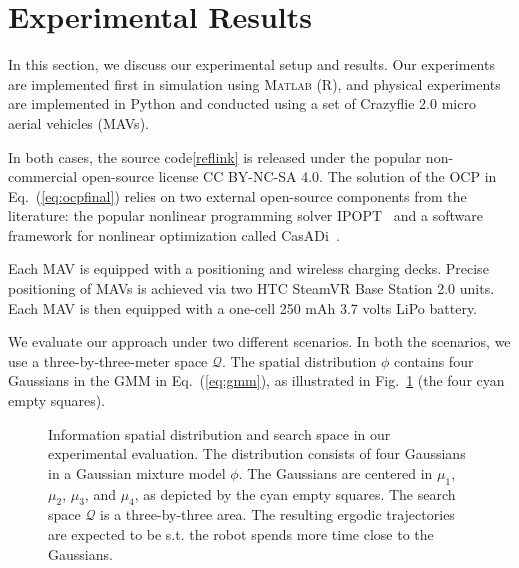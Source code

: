 \documentclass[letterpaper,10pt,conference,twoside]{IEEEtran}
\theoremstyle{definition}
\begin{document}
\section{Experimental Results}\label{sec:res}
\noindent
In this section, we discuss our experimental setup and results. Our experiments are implemented first in simulation using  \textsc{Matlab} (R), and physical experiments  are implemented in Python and conducted using a set of Crazyflie 2.0 micro aerial vehicles (MAVs). 

In both cases, the source code\cref{reflink} is released under the popular non-commercial open-source license CC BY-NC-SA 4.0. The solution of the OCP in Eq.~(\ref{eq:ocpfinal}) relies on two external open-source components from the literature: the popular nonlinear programming solver IPOPT~\cite{wachter2006implementation} and a software framework for nonlinear optimization called CasADi~\cite{andersson2012casadi}.

Each MAV is equipped with a positioning and wireless charging decks. Precise positioning of MAVs is achieved via two HTC SteamVR Base Station 2.0 units. Each MAV is then equipped with a one-cell 250 mAh 3.7 volts LiPo battery.%

We evaluate our approach under two different scenarios. In both the scenarios, we use a three-by-three-meter space $\mathcal{Q}$. The spatial distribution $\phi$ contains four Gaussians in the GMM in Eq.~(\ref{eq:gmm}), as illustrated in Fig.~\ref{fig:scenario} (the four cyan empty squares).

\begin{figure}[t!]
  \begin{minipage}[t!]{.5\columnwidth}
    \vspace*{-.2cm}
    
  \end{minipage}
  \begin{minipage}[c]{.48\columnwidth}
    \vspace*{.05cm}
    \caption{Information spatial distribution and search space in our experimental evaluation. The distribution consists of four Gaussians in a Gaussian mixture model $\phi$. The Gaussians are centered in $\mu_1$, $\mu_2$, $\mu_3$, and $\mu_4$, as depicted by the cyan empty squares. The search space $\mathcal{Q}$ is a three-by-three area. The resulting ergodic trajectories are expected to be s.t. the robot spends more time close to the Gaussians.}
    \label{fig:scenario}
  \end{minipage}
\end{figure}
\end{document}
